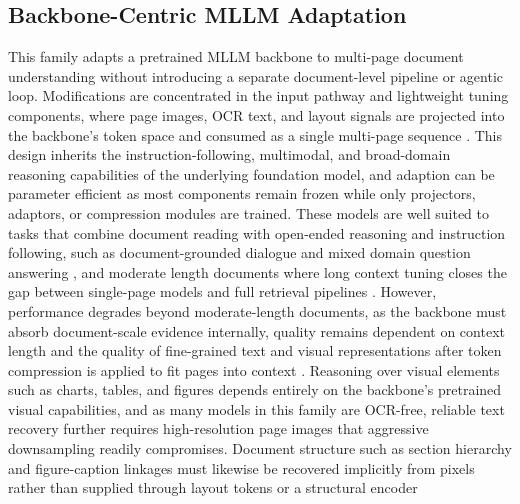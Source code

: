 \documentclass[11pt]{article}
\begin{document}
\subsection{Backbone-Centric MLLM Adaptation}

This family adapts a pretrained MLLM backbone to multi-page document understanding without introducing a separate document-level pipeline or agentic loop. Modifications are concentrated in the input pathway and lightweight tuning components, where page images, OCR text, and layout signals are projected into the backbone's token space and consumed as a single multi-page sequence \cite{zhu2025simple}. This design inherits the instruction-following, multimodal, and broad-domain reasoning capabilities of the underlying foundation model, and adaption can be parameter efficient as most components remain frozen while only projectors, adaptors, or compression modules are trained. These models are well suited to tasks that combine document reading with open-ended reasoning and instruction following, such as document-grounded dialogue and mixed domain question answering \cite{tanaka2024instructdoc, duan2025docopilot}, and moderate length documents where long context tuning closes the gap between single-page models and full retrieval pipelines \cite{hu2024mplug, yu2024texthawk2}. However, performance degrades beyond moderate-length documents, as the backbone must absorb document-scale evidence internally, quality remains dependent on context length and the quality of fine-grained text and visual representations after token compression is applied to fit pages into context \cite{jia2024leopard}. Reasoning over visual elements such as charts, tables, and figures depends entirely on the backbone's pretrained visual capabilities, and as many models in this family are OCR-free, reliable text recovery further requires high-resolution page images that aggressive downsampling readily compromises. Document structure such as section hierarchy and figure-caption linkages must likewise be recovered implicitly from pixels rather than supplied through layout tokens or a structural encoder \cite{hannan2025docslm, duan2025docopilot}
\end{document}

